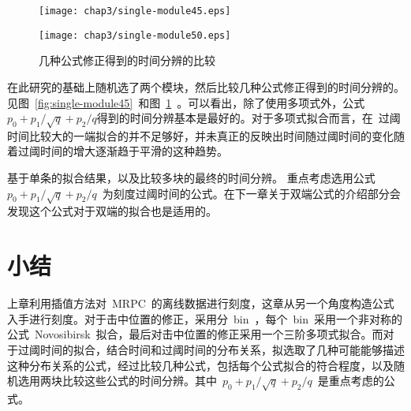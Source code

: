 \begin{figure}[!h]
\begin{minipage}[!h]{0.5\linewidth}
\texttt{[image: chap3/single-module45.eps]}
\label{fig:single-module45}
\end{minipage}%
\hfill
\begin{minipage}[!h]{0.5\linewidth}
\texttt{[image: chap3/single-module50.eps]}
\label{fig:single-module50}
\end{minipage}
\caption{几种公式修正得到的时间分辨的比较}
\end{figure}
在此研究的基础上随机选了两个模块，然后比较几种公式修正得到的时间分辨的。见图~\ref{fig:single-module45}~和图~\ref{fig:single-module50}~。可以看出，除了使用多项式外，公式${p_{0}+p_{1}/\sqrt{q}+p_{2}/q}$得到的时间分辨基本是最好的。对于多项式拟合而言，在~过阈时间比较大的一端拟合的并不足够好，并未真正的反映出时间随过阈时间的变化随着过阈时间的增大逐渐趋于平滑的这种趋势。

基于单条的拟合结果，以及比较多块的最终的时间分辨。
重点考虑选用公式~${p_{0}+p_{1}/\sqrt{q}+p_{2}/q}$~为刻度过阈时间的公式。在下一章关于双端公式的介绍部分会发现这个公式对于双端的拟合也是适用的。

\section{小结}

上章利用插值方法对~MRPC~的离线数据进行刻度，这章从另一个角度构造公式入手进行刻度。对于击中位置的修正，采用分~bin~，每个~bin~采用一个非对称的公式~Novosibirsk~拟合，最后对击中位置的修正采用一个三阶多项式拟合。而对于过阈时间的拟合，结合时间和过阈时间的分布关系，拟选取了几种可能能够描述这种分布关系的公式，经过比较几种公式，包括每个公式拟合的符合程度，以及随机选用两块比较这些公式的时间分辨。其中~${p_{0}+p_{1}/\sqrt{q}+p_{2}/q}$~是重点考虑的公式。









